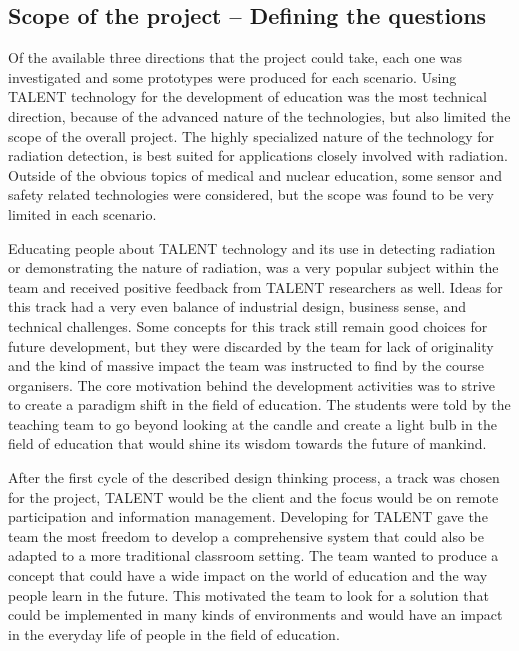 \documentclass[english,12pt,a4paper,pdftex]{article}
\begin{document}
\subsection{Scope of the project -- Defining the questions}

Of the available three directions that the project could take, each one was investigated and some prototypes were produced for each scenario. Using TALENT technology for the development of education was the most technical direction, because of the advanced nature of the technologies, but also limited the scope of the overall project. The highly specialized nature of the technology for radiation detection, is best suited for applications closely involved with radiation. Outside of the obvious topics of medical and nuclear education, some sensor and safety related technologies were considered, but the scope was found to be very limited in each scenario.

Educating people about TALENT technology and its use in detecting radiation or demonstrating the nature of radiation, was a very popular subject within the team and received positive feedback from TALENT researchers as well. Ideas for this track had a very even balance of industrial design, business sense, and technical challenges. Some concepts for this track still remain good choices for future development, but they were discarded by the team for lack of originality and the kind of massive impact the team was instructed to find by the course organisers. The core motivation behind the development activities was to strive to create a paradigm shift in the field of education. The students were told by the teaching team to go beyond looking at the candle and create a light bulb in the field of education that would shine its wisdom towards the future of mankind.

After the first cycle of the described design thinking process, a track was chosen for the project, TALENT would be the client and the focus would be on remote participation and information management. Developing for TALENT gave the team the most freedom to develop a comprehensive system that could also be adapted to a more traditional classroom setting. The team wanted to produce a concept that could have a wide impact on the world of education and the way people learn in the future. This motivated the team to look for a solution that could be implemented in many kinds of environments and would have an impact in the everyday life of people in the field of education.
\end{document}
